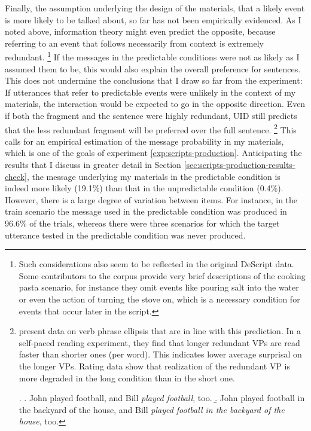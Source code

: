 \largerpage[-2]
Finally, the assumption underlying the design of the materials, that a likely event is more likely to be talked about, so far has not been empirically evidenced. As I noted above, information theory might even predict the opposite, because referring to an event that follows necessarily from context is extremely redundant.%
%
\footnote{Such considerations also seem to be reflected in the original DeScript data. Some contributors to the corpus provide very brief descriptions of the cooking pasta scenario, for instance they omit events like pouring salt into the water or even the action of turning the stove on, which is a necessary condition for events that occur later in the script.}\afterfn%
%
If the messages in the predictable conditions were not as likely as I assumed them to be, this would also explain the overall preference for sentences. This does not undermine the conclusions that I draw so far from the experiment: If utterances that refer to predictable events were unlikely in the context of my materials, the interaction would be expected to go in the opposite direction. Even if both the fragment and the sentence were highly redundant, UID still predicts that the less redundant fragment will be preferred over the full sentence.%
%
\footnote{\citet{schafer.etalunderreview} present data on verb phrase ellipsis that are in line with this prediction. In a self-paced reading experiment, they find that longer redundant VPs \Next[a] are read faster than shorter ones \Next[b] (per word). This indicates lower average surprisal on the longer VPs. Rating data show that realization of the redundant VP is more degraded in the long condition than in the short one.

\ex. \a. John played football, and Bill \textit{played football}, too.
    \b.  John played football in the backyard of the house, and Bill \textit{played football in the backyard of the house}, too.

}\afterfn%
% 
This calls for an empirical estimation of the message probability in my materials, which is one of the goals of experiment \ref{exp:scripts-production}. Anticipating the results that I discuss in greater detail in Section \ref{sec:scripts-production-results-check}, the message underlying my materials in the predictable condition is indeed more likely (19.1\%) than that in the unpredictable condition (0.4\%). However, there is a large degree of variation between items. For instance, in the train scenario the message used in the predictable condition was produced in 96.6\% of the trials, whereas there were three scenarios for which the target utterance tested in the predictable condition was never produced.

